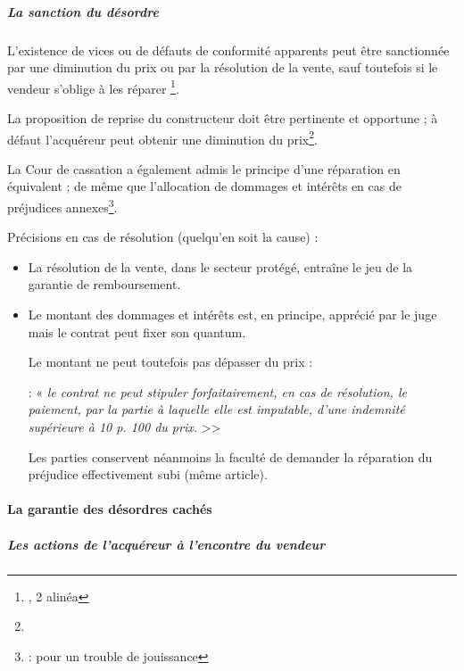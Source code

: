 				\subparagraph{La sanction du désordre}

				L’existence de vices ou de défauts de conformité apparents peut être sanctionnée par une diminution du prix ou par la résolution de la vente, sauf toutefois si le vendeur s’oblige à les réparer \footnote{, 2\ieme{} alinéa}.

				La proposition de reprise du constructeur doit être pertinente et opportune ; à défaut l’acquéreur peut obtenir une diminution du prix\footnote{}.

				La Cour de cassation a également admis le principe d’une réparation en équivalent ; de même que l’allocation de dommages et intérêts en cas de préjudices annexes\footnote{ : pour un trouble de jouissance}.


				\bigbreak Précisions en cas de résolution (quelqu’en soit la cause) :
				\begin{itemize}
					\item La résolution de la vente, dans le secteur protégé, entraîne le jeu de la garantie de remboursement.

					\item Le montant des dommages et intérêts est, en principe, apprécié par le juge mais le contrat peut fixer son quantum.

					Le montant ne peut toutefois pas dépasser  du prix :

					  : « {\itshape le contrat ne peut stipuler forfaitairement, en cas de résolution, le paiement, par la partie à laquelle elle est imputable, d'une indemnité supérieure à 10 p. 100 du prix.} >>

					Les parties conservent néanmoins la faculté de demander la réparation du préjudice effectivement subi (même article).
				\end{itemize}

			\paragraph{La garantie des désordres cachés}

				\subparagraph{Les actions de l'acquéreur à l'encontre du vendeur}

